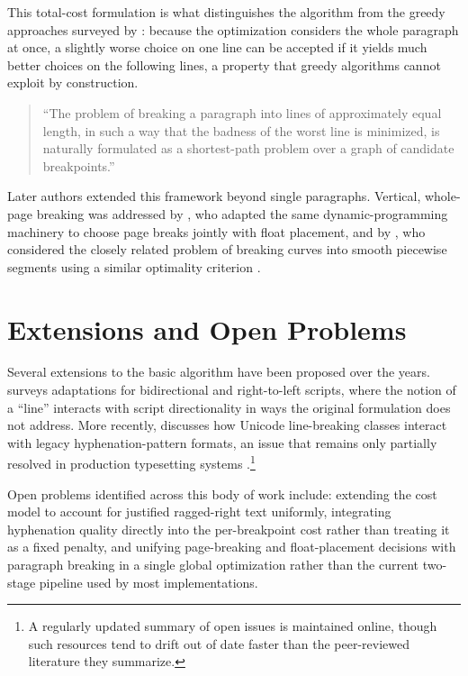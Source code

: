 \documentclass[11pt]{article}
\begin{document}
This total-cost formulation is what distinguishes the algorithm from the
greedy approaches surveyed by \citep{plass1981}: because the optimization
considers the whole paragraph at once, a slightly worse choice on one line
can be accepted if it yields much better choices on the following lines,
a property that greedy algorithms cannot exploit by construction.

\begin{quote}
``The problem of breaking a paragraph into lines of approximately equal
length, in such a way that the badness of the worst line is minimized, is
naturally formulated as a shortest-path problem over a graph of candidate
breakpoints.''
\end{quote}

Later authors extended this framework beyond single paragraphs. Vertical,
whole-page breaking was addressed by \citet{frank1990}, who adapted the
same dynamic-programming machinery to choose page breaks jointly with float
placement, and by \citet{hobby1986}, who considered the closely related
problem of breaking curves into smooth piecewise segments using a similar
optimality criterion \citep{hobby1986,frank1990}.

\section{Extensions and Open Problems}

Several extensions to the basic algorithm have been proposed over the
years. \citet{barron1995} surveys adaptations for bidirectional and
right-to-left scripts, where the notion of a ``line'' interacts with
script directionality in ways the original formulation does not address.
More recently, \citet{unicode2000} discusses how Unicode line-breaking
classes interact with legacy hyphenation-pattern formats, an issue that
remains only partially resolved in production typesetting systems
\citep{unicode2000,barron1995}.\footnote{A regularly updated summary of
open issues is maintained online, though such resources tend to drift out
of date faster than the peer-reviewed literature they summarize.}

Open problems identified across this body of work \citep{knuthplass1981,
liang1983, plass1981, hobby1986, frank1990, barron1995, unicode2000}
include: extending the cost model to account for justified ragged-right
text uniformly, integrating hyphenation quality directly into the
per-breakpoint cost rather than treating it as a fixed penalty, and
unifying page-breaking and float-placement decisions with paragraph
breaking in a single global optimization rather than the current
two-stage pipeline used by most implementations.
\end{document}
